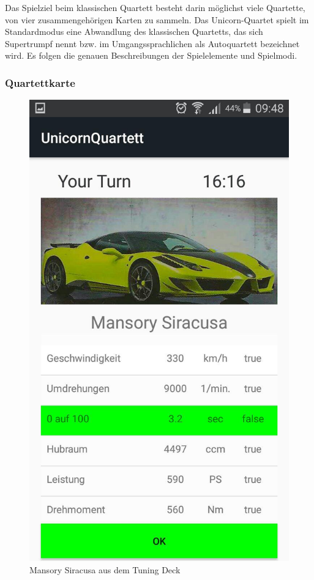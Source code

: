 \documentclass{scrartcl}
\begin{document}
Das Spielziel beim klassischen Quartett besteht darin möglichst viele Quartette, von vier zusammengehörigen
Karten zu sammeln. Das Unicorn-Quartet spielt im Standardmodus eine Abwandlung des klassischen 
Quartetts, das sich Supertrumpf nennt bzw. im Umgangssprachlichen als
Autoquartett  bezeichnet wird. Es folgen die genauen Beschreibungen der Spielelemente und Spielmodi.
\subsubsection{Quartettkarte}

\begin{figure}[!ht]
\begin{center}
    \includegraphics[scale=0.3]{pics/gameplay.jpg}
    \caption{Mansory Siracusa aus dem Tuning Deck}
\end{center}
\end{figure}
\end{document}
